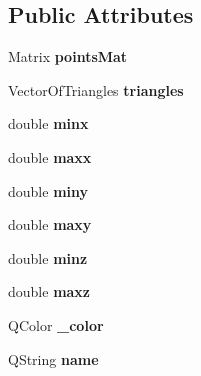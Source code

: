 \subsection*{Public Attributes}
\begin{DoxyCompactItemize}
\item 
\hypertarget{class_mesh_a26329b548fe51fc74fd771dec1d0268e}{Matrix {\bfseries points\+Mat}}\label{class_mesh_a26329b548fe51fc74fd771dec1d0268e}

\item 
\hypertarget{class_mesh_a4037422a7f812f087cb969b16552a9b4}{Vector\+Of\+Triangles {\bfseries triangles}}\label{class_mesh_a4037422a7f812f087cb969b16552a9b4}

\item 
\hypertarget{class_mesh_a5177375a503f9e6bd33852b6c661af32}{double {\bfseries minx}}\label{class_mesh_a5177375a503f9e6bd33852b6c661af32}

\item 
\hypertarget{class_mesh_ac23e3af8b76181163896ae085d868407}{double {\bfseries maxx}}\label{class_mesh_ac23e3af8b76181163896ae085d868407}

\item 
\hypertarget{class_mesh_a926fde7d276e87dde8fdcb1737ec2d3a}{double {\bfseries miny}}\label{class_mesh_a926fde7d276e87dde8fdcb1737ec2d3a}

\item 
\hypertarget{class_mesh_a303314f01fe21f60f7aa8320a0584c9d}{double {\bfseries maxy}}\label{class_mesh_a303314f01fe21f60f7aa8320a0584c9d}

\item 
\hypertarget{class_mesh_acac8b325e61d38e2b93fa449d2cb3d0e}{double {\bfseries minz}}\label{class_mesh_acac8b325e61d38e2b93fa449d2cb3d0e}

\item 
\hypertarget{class_mesh_af4f13ea01c80e9257ece8cc485503563}{double {\bfseries maxz}}\label{class_mesh_af4f13ea01c80e9257ece8cc485503563}

\item 
\hypertarget{class_mesh_a7d5ba3130fd61ba924b9956aedab6fc8}{Q\+Color {\bfseries \+\_\+color}}\label{class_mesh_a7d5ba3130fd61ba924b9956aedab6fc8}

\item 
\hypertarget{class_mesh_a260e1666474b12fce4b6397549a29925}{Q\+String {\bfseries name}}\label{class_mesh_a260e1666474b12fce4b6397549a29925}

\end{DoxyCompactItemize}


